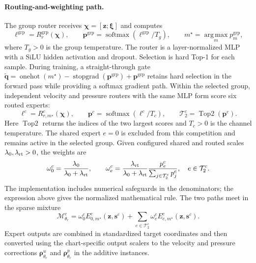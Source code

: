 \paragraph{Routing-and-weighting path.}
The group router receives $\bm\chi=[\bm z;\bm\xi]$ and computes
\begin{equation}
  \bm\ell^{\mathrm{grp}}=R_r^{\mathrm{grp}}(\bm\chi),
  \qquad
  \bm p^{\mathrm{grp}}
   =\operatorname{softmax}(\bm\ell^{\mathrm{grp}}/T_g),
  \qquad
  m^\star=\operatorname*{arg\,max}_m p_m^{\mathrm{grp}},
  \label{eq:main_group_selection}
\end{equation}
where $T_g>0$ is the group temperature. The router is a
layer-normalized MLP with a SiLU hidden activation and dropout. Selection is hard Top-1 for each sample. During training, a straight-through gate
$\widetilde{\bm q}=\operatorname{onehot}(m^\star)
-\operatorname{stopgrad}(\bm p^{\mathrm{grp}})
+\bm p^{\mathrm{grp}}$
retains hard selection in the forward pass while providing a
softmax gradient path.  Within the selected group, independent velocity and pressure routers with the same MLP form score six routed experts:
\begin{equation}
  \bm\ell^c=R_{r,m^\star}^c(\bm\chi),
  \qquad
  \bm p^c=\operatorname{softmax}(\bm\ell^c/T_c),
  \qquad
  \mathcal T_2^c=\operatorname{Top2}(\bm p^c).
  \label{eq:main_channel_selection}
\end{equation}
Here $\operatorname{Top2}$ returns the indices of the two largest scores and $T_c>0$ is the channel temperature. The shared expert $e=0$ is excluded from this competition and remains active in the selected group. Given configured shared and routed scales
$\lambda_0,\lambda_{\rm rt}>0$, the weights are
\begin{equation}
  \omega_0^c=\frac{\lambda_0}{\lambda_0+\lambda_{\rm rt}},
  \qquad
  \omega_e^c=
  \frac{\lambda_{\rm rt}}{\lambda_0+\lambda_{\rm rt}}
  \frac{p_e^c}{\sum_{j\in\mathcal T_2^c}p_j^c},
  \quad e\in\mathcal T_2^c.
  \label{eq:main_routing_weights}
\end{equation}
The implementation includes numerical safeguards in the denominators; the expression above gives the normalized mathematical rule. The two paths meet in the sparse mixture
\begin{equation}
  \mathcal M_{\theta_r}^c
  =\omega_0^c E_{0,m^\star}^c(\bm z,\bm s^c)
   +\sum_{e\in\mathcal T_2^c}
     \omega_e^c E_{e,m^\star}^c(\bm z,\bm s^c).
  \label{eq:main_inner_moe}
\end{equation}
Expert outputs are combined in standardized target coordinates and then converted using the chart-specific output scalers to the
velocity and pressure corrections $\bm\rho^u_{\theta_r}$ and
$\bm\rho^p_{\theta_r}$ in the additive instances.



